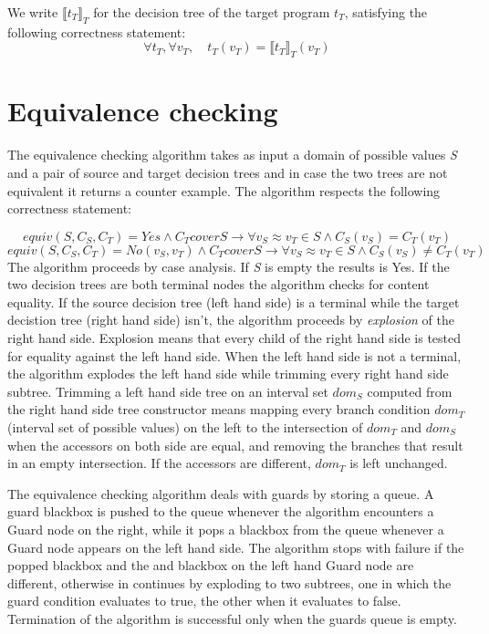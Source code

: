 \documentclass[12pt]{article}
\newcommand{\sem}[1]{{\llbracket{#1}\rrbracket}}
\begin{document}
We write $\sem{t_T}_T$ for the decision tree of the target program
$t_T$, satisfying the following correctness statement:
\[
\forall t_T, \forall v_T, \quad t_T(v_T) = \sem{t_T}_T(v_T)
\]

\section{Equivalence checking}
The equivalence checking algorithm takes as input a domain of
possible values \emph{S} and a pair of source and target decision trees and
in case the two trees are not equivalent it returns a counter example.
The algorithm respects the following correctness statement:

\[
 equiv(S, C_S, C_T) = Yes \land C_T cover S \to \forall v_S \approx
v_T \in S \land C_S(v_S) = C_T(v_T)
\]
\[
equiv(S, C_S, C_T) = No(v_S,v_T) \land C_T cover S \to \forall v_S \approx
v_T \in S \land C_S(v_S) \neq C_T(v_T)
\]
The algorithm proceeds by case analysis.
If \emph{S} is empty the results is Yes.
If the two decision trees are both terminal nodes the algorithm checks
for content equality.
If the source decision tree (left hand side) is a terminal while the
target decistion tree (right hand side) isn't, the algorithm proceeds
by \emph{explosion} of the right hand side. Explosion means that every
child of the right hand side is tested for equality against the left
hand side.
When the left hand side is not a terminal, the algorithm explodes the
left hand side while trimming every right hand side subtree. Trimming
a left hand side tree on an interval set \emph{$dom_S$} computed from the right hand
side tree constructor means mapping every branch condition \emph{$dom_T$} (interval set of
possible values) on the left to the intersection of \emph{$dom_T$} and \emph{$dom_S$} when
the accessors on both side are equal, and removing the branches that
result in an empty intersection. If the accessors are different,
\emph{$dom_T$} is left unchanged.

The equivalence checking algorithm deals with guards by storing a
queue. A guard blackbox is pushed to the queue whenever the algorithm
encounters a Guard node on the right, while it pops a blackbox from
the queue whenever a Guard node appears on the left hand side.
The algorithm stops with failure if the popped blackbox and the and
blackbox on the left hand Guard node are different, otherwise in
continues by exploding to two subtrees, one in which the guard
condition evaluates to true, the other when it evaluates to false.
Termination of the algorithm is successful only when the guards queue
is empty.
\end{document}
